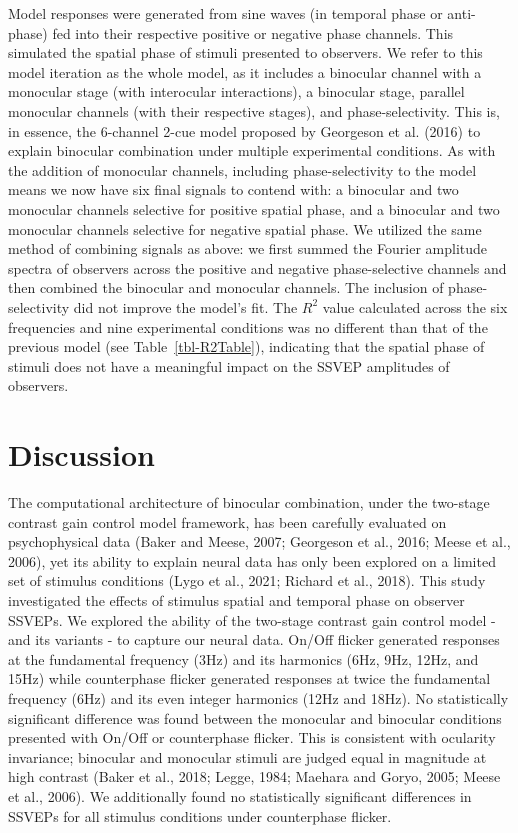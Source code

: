 \documentclass[
  12pt,
]{article}
\begin{document}
Model responses were generated from sine waves (in temporal phase or
anti-phase) fed into their respective positive or negative phase
channels. This simulated the spatial phase of stimuli presented to
observers. We refer to this model iteration as the whole model, as it
includes a binocular channel with a monocular stage (with interocular
interactions), a binocular stage, parallel monocular channels (with
their respective stages), and phase-selectivity. This is, in essence,
the 6-channel 2-cue model proposed by Georgeson et al. (2016) to explain
binocular combination under multiple experimental conditions. As with
the addition of monocular channels, including phase-selectivity to the
model means we now have six final signals to contend with: a binocular
and two monocular channels selective for positive spatial phase, and a
binocular and two monocular channels selective for negative spatial
phase. We utilized the same method of combining signals as above: we
first summed the Fourier amplitude spectra of observers across the
positive and negative phase-selective channels and then combined the
binocular and monocular channels. The inclusion of phase-selectivity did
not improve the model's fit. The \(R^2\) value calculated across the six
frequencies and nine experimental conditions was no different than that
of the previous model (see Table~\ref{tbl-R2Table}), indicating that the
spatial phase of stimuli does not have a meaningful impact on the SSVEP
amplitudes of observers.

\section{Discussion}\label{discussion}

The computational architecture of binocular combination, under the
two-stage contrast gain control model framework, has been carefully
evaluated on psychophysical data (Baker and Meese, 2007; Georgeson et
al., 2016; Meese et al., 2006), yet its ability to explain neural data
has only been explored on a limited set of stimulus conditions (Lygo et
al., 2021; Richard et al., 2018). This study investigated the effects of
stimulus spatial and temporal phase on observer SSVEPs. We explored the
ability of the two-stage contrast gain control model - and its variants
- to capture our neural data. On/Off flicker generated responses at the
fundamental frequency (3Hz) and its harmonics (6Hz, 9Hz, 12Hz, and 15Hz)
while counterphase flicker generated responses at twice the fundamental
frequency (6Hz) and its even integer harmonics (12Hz and 18Hz). No
statistically significant difference was found between the monocular and
binocular conditions presented with On/Off or counterphase flicker. This
is consistent with ocularity invariance; binocular and monocular stimuli
are judged equal in magnitude at high contrast (Baker et al., 2018;
Legge, 1984; Maehara and Goryo, 2005; Meese et al., 2006). We
additionally found no statistically significant differences in SSVEPs
for all stimulus conditions under counterphase flicker.
\end{document}

